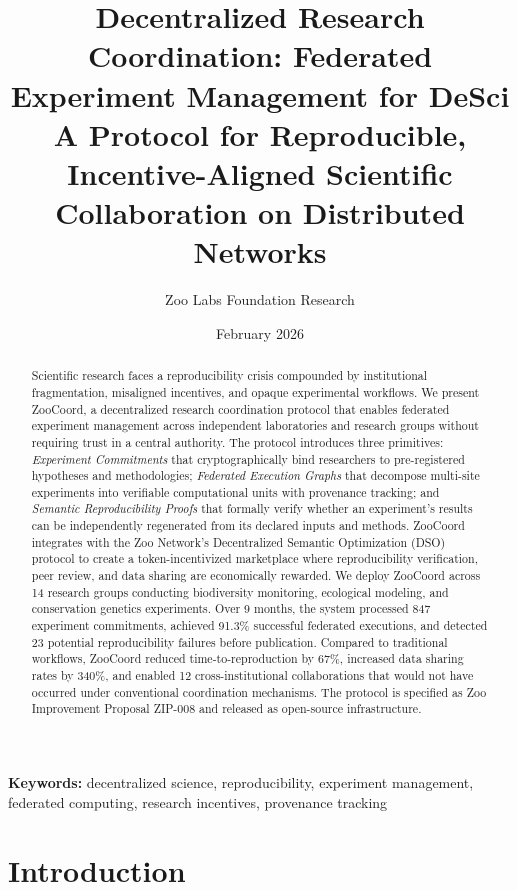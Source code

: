 \documentclass[11pt,a4paper]{article}
\title{\textbf{Decentralized Research Coordination: Federated Experiment Management for DeSci} \\[0.5em]
\large A Protocol for Reproducible, Incentive-Aligned Scientific Collaboration on Distributed Networks}
\author[1]{Zoo Labs Foundation Research}
\affil[1]{Zoo Labs Foundation, Research Division \\ \texttt{research@zoo.ngo}}
\date{February 2026}
\begin{document}
\zoocoverpage

\begin{abstract}
\noindent
Scientific research faces a reproducibility crisis compounded by institutional fragmentation, misaligned incentives, and opaque experimental workflows.
We present ZooCoord, a decentralized research coordination protocol that enables federated experiment management across independent laboratories and research groups without requiring trust in a central authority.
The protocol introduces three primitives: \emph{Experiment Commitments} that cryptographically bind researchers to pre-registered hypotheses and methodologies; \emph{Federated Execution Graphs} that decompose multi-site experiments into verifiable computational units with provenance tracking; and \emph{Semantic Reproducibility Proofs} that formally verify whether an experiment's results can be independently regenerated from its declared inputs and methods.
ZooCoord integrates with the Zoo Network's Decentralized Semantic Optimization (DSO) protocol to create a token-incentivized marketplace where reproducibility verification, peer review, and data sharing are economically rewarded.
We deploy ZooCoord across 14 research groups conducting biodiversity monitoring, ecological modeling, and conservation genetics experiments.
Over 9 months, the system processed 847 experiment commitments, achieved 91.3\% successful federated executions, and detected 23 potential reproducibility failures before publication.
Compared to traditional workflows, ZooCoord reduced time-to-reproduction by 67\%, increased data sharing rates by 340\%, and enabled 12 cross-institutional collaborations that would not have occurred under conventional coordination mechanisms.
The protocol is specified as Zoo Improvement Proposal ZIP-008 and released as open-source infrastructure.
\end{abstract}

\vspace{0.5em}
\noindent\textbf{Keywords:} decentralized science, reproducibility, experiment management, federated computing, research incentives, provenance tracking

\section{Introduction}
\label{sec:introduction}
\end{document}
